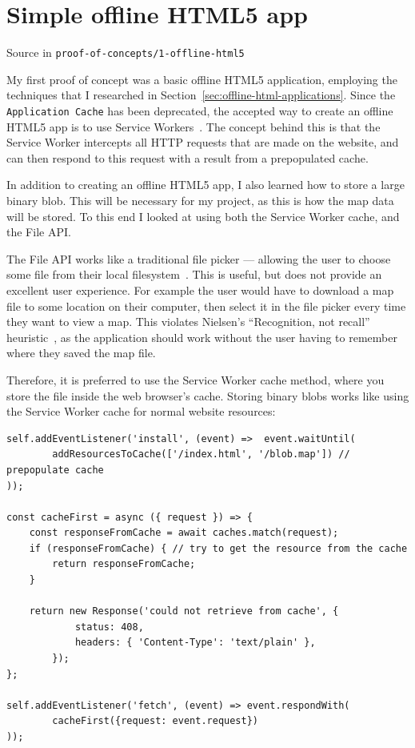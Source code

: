 \documentclass{final_report}
\begin{document}
\section{Simple offline HTML5 app}

{ \hfill \footnotesize Source in \texttt{proof-of-concepts/1-offline-html5}}

My first proof of concept was a basic offline HTML5 application, employing the techniques that I researched in Section~\ref{sec:offline-html-applications}. Since the \texttt{Application Cache} has been deprecated, the accepted way to create an offline HTML5 app is to use Service Workers~\cite{w3c-service-workers-caches}. The concept behind this is that the Service Worker intercepts all HTTP requests that are made on the website, and can then respond to this request with a result from a prepopulated cache.

In addition to creating an offline HTML5 app, I also learned how to store a large binary blob. This will be necessary for my project, as this is how the map data will be stored. To this end I looked at using both the Service Worker cache, and the File API\@.

The File API works like a traditional file picker --- allowing the user to choose some file from their local filesystem~\cite{w3c-file-api}. This is useful, but does not provide an excellent user experience. For example the user would have to download a map file to some location on their computer, then select it in the file picker every time they want to view a map. This violates Nielsen's ``Recognition, not recall'' heuristic~\cite{nielsen-heuristics}, as the application should work without the user having to remember where they saved the map file.

Therefore, it is preferred to use the Service Worker cache method, where you store the file inside the web browser's cache. Storing binary blobs works like using the Service Worker cache for normal website resources:

\begin{lstlisting}[caption=Using the Service Worker cache]
self.addEventListener('install', (event) =>  event.waitUntil(
        addResourcesToCache(['/index.html', '/blob.map']) // prepopulate cache
));

const cacheFirst = async ({ request }) => {
    const responseFromCache = await caches.match(request);
    if (responseFromCache) { // try to get the resource from the cache
        return responseFromCache;
    }

    return new Response('could not retrieve from cache', {
            status: 408,
            headers: { 'Content-Type': 'text/plain' },
        });
};

self.addEventListener('fetch', (event) => event.respondWith(
        cacheFirst({request: event.request})
));
\end{lstlisting}
\end{document}
